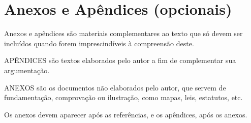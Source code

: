 \documentclass[a4paper,11pt,fleqn]{article}
\begin{document}




\section*{Anexos e Apêndices (opcionais)}

Anexos e apêndices são materiais complementares ao texto que só devem ser incluídos quando forem imprescindíveis à compreensão deste.

APÊNDICES são textos elaborados pelo autor a fim de complementar sua argumentação.

ANEXOS são os documentos não elaborados pelo autor, que servem de fundamentação, comprovação ou ilustração, como mapas, leis, estatutos, etc.

Os anexos devem aparecer após as referências, e os apêndices, após os anexos.
\end{document}
